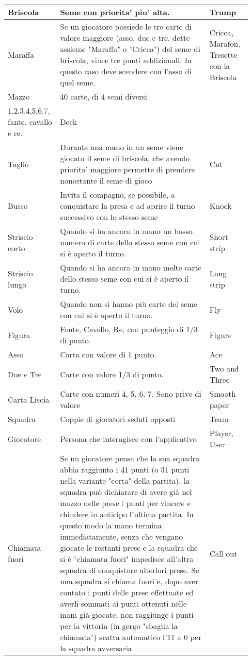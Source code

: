 \begin{table}[!ht]
\begin{tabular}{|l|l|l|}
        Briscola & Seme con priorita’ piu’ alta. & Trump \\ \hline
        Maraffa & Se un giocatore possiede le tre carte di valore maggiore (asso, due e tre, dette assieme "Maraffa" o "Cricca") del seme di briscola, vince tre punti addizionali. In questo caso deve scendere con l'asso di quel seme. & Cricca, Marafon, Tresette con la Briscola \\ \hline
        Mazzo & 40 carte, di 4 semi diversi & ~ \\ \hline
        1,2,3,4,5,6,7, fante, cavallo e re. & Deck & ~ \\ \hline
        Taglio & Durante una mano in un seme viene giocato il seme di briscola, che avendo priorita’ maggiore permette di prendere nonostante il seme di gioco & Cut \\ \hline
        Busso & Invita il compagno, se possibile, a conquistare la presa e ad aprire il turno successivo con lo stesso seme & Knock \\ \hline
        Striscio corto & Quando si ha ancora in mano un basso numero di carte dello stesso seme con cui si è aperto il turno. & Short strip \\ \hline
        Striscio lungo & Quando si ha ancora in mano molte carte dello stesso seme con cui si è aperto il turno. & Long strip \\ \hline
        Volo & Quando non si hanno più carte del seme con cui si è aperto il turno. & Fly \\ \hline
        Figura & Fante, Cavallo, Re, con punteggio di 1/3 di punto. & Figure \\ \hline
        Asso & Carta con valore di 1 punto. & Ace \\ \hline
        Due e Tre & Carte con valore 1/3 di punto. & Two and Three \\ \hline
        Carta Liscia & Carte con numeri 4, 5, 6, 7. Sono prive di valore & Smooth paper \\ \hline
        Squadra & Coppie di giocatori seduti opposti & Team \\ \hline
        Giocatore & Persona che interagisce con l’applicativo & Player, User \\ \hline
        Chiamata fuori & Se un giocatore pensa che la sua squadra abbia raggiunto i 41 punti (o 31 punti nella variante "corta" della partita), la squadra può  dichiarare di avere già nel mazzo delle prese i punti per vincere e chiudere in anticipo l'ultima partita. In questo modo la mano termina immediatamente, senza che vengano giocate le restanti prese e la squadra che si è "chiamata fuori" impedisce all'altra squadra di conquistare ulteriori prese. Se una squadra si chiama fuori e, dopo aver contato i punti delle prese effettuate ed averli sommati ai punti ottenuti nelle mani già giocate, non raggiunge i punti per la vittoria (in gergo "sbaglia la chiamata") scatta automatico l'11 a 0 per la squadra avversaria & Call out \\ \hline
    \end{tabular}
\end{table}
